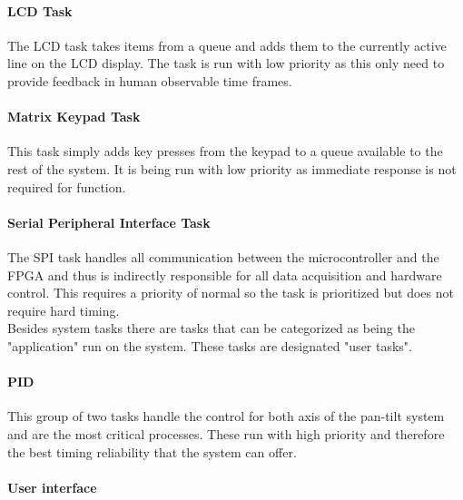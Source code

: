 \documentclass[../../../main]{subfiles}
\begin{document}
\paragraph{LCD Task}

The LCD task takes items from a queue and adds them to the currently active line on the LCD display. The task is run with low  priority as this only need to provide feedback in human observable time frames.

\paragraph{Matrix Keypad Task}

This task simply adds key presses from the keypad to a queue available to the rest of the system. It is being run with low priority as immediate response is not required for function.

\paragraph{Serial Peripheral Interface Task}

The SPI task handles all communication between the microcontroller and the FPGA and thus is indirectly responsible for all data acquisition and hardware control. This requires a priority of normal so the task is prioritized but does not require hard timing.\\

Besides system tasks there are tasks that can be categorized as being the "application" run on the system. These tasks are designated "user tasks".

\paragraph{PID}

This group of two tasks handle the control for both axis of the pan-tilt system and are the most critical processes. These run with high priority and therefore the best timing reliability that the system can offer.

\paragraph{User interface}
\end{document}
